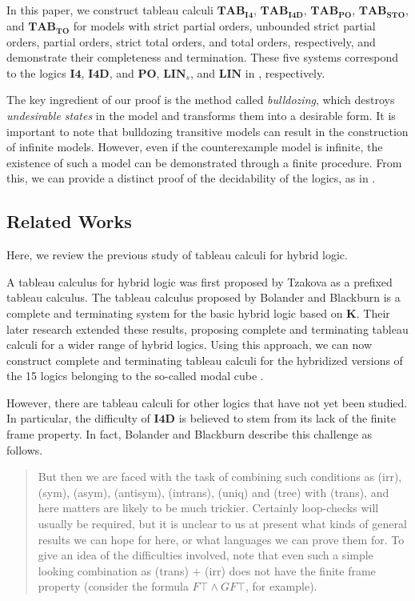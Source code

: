 \documentclass{article}
\theoremstyle{definition}
\newcommand{\tableauIF}{\mathbf{TAB}_{\mathbf{I4}}}
\newcommand{\tableauIFD}{\mathbf{TAB}_{\mathbf{I4D}}}
\newcommand{\tableauPO}{\mathbf{TAB}_{\textbf{PO}}}
\newcommand{\tableauIFT}{\mathbf{TAB}_{\textbf{STO}}}
\newcommand{\tableauTO}{\mathbf{TAB}_{\textbf{TO}}}
\begin{document}
In this paper, we construct tableau calculi $\tableauIF$, $\tableauIFD$, $\tableauPO$, $\tableauIFT$, and $\tableauTO$ for models with strict partial orders, unbounded strict partial orders, partial orders, strict total orders, and total orders, respectively, and demonstrate their completeness and termination.
These five systems correspond to the logics $\mathbf{I4}$, $\mathbf{I4D}$, and $\mathbf{PO}$, $\mathbf{LIN}_s$, and $\mathbf{LIN}$ in \cite{blackburn1993}, respectively.

The key ingredient of our proof is the method called \emph{bulldozing}, which destroys \emph{undesirable states} in the model and transforms them into a desirable form. It is important to note that bulldozing transitive models can result in the construction of infinite models. However, even if the counterexample model is infinite, the existence of such a model can be demonstrated through a finite procedure. From this, we can provide a distinct proof of the decidability of the logics, as in \cite{blackburn1993}.

\subsection{Related Works}

Here, we review the previous study of tableau calculi for hybrid logic.

A tableau calculus for hybrid logic was first proposed by Tzakova \cite{tzakova1999} as a prefixed tableau calculus. The tableau calculus proposed by Bolander and Blackburn \cite{bolander2007} is a complete and terminating system for the basic hybrid logic based on $\mathbf{K}$. Their later research \cite{bolander2009} extended these results, proposing complete and terminating tableau calculi for a wider range of hybrid logics. Using this approach, we can now construct complete and terminating tableau calculi for the hybridized versions of the 15 logics belonging to the so-called modal cube \cite[\S 8]{SEPmodallogic}.

However, there are tableau calculi for other logics that have not yet been studied. In particular, the difficulty of $\mathbf{I4D}$ is believed to stem from its lack of the finite frame property. In fact, Bolander and Blackburn \cite{bolander2009} describe this challenge as follows.
\begin{quotation}
    But then we are faced with the task of combining such conditions as (irr), (sym), (asym), (antisym), (intrans), (uniq) and (tree) with (trans), and here matters are likely to be much trickier. Certainly loop-checks will usually be required, but it is unclear to us at present what kinds of general results we can hope for here, or what languages we can prove them for. To give an idea of the difficulties involved, note that even such a simple looking combination as (trans) $+$ (irr) does not have the finite frame property (consider the formula $F \top \land GF \top$, for example).
\end{quotation}
\end{document}
